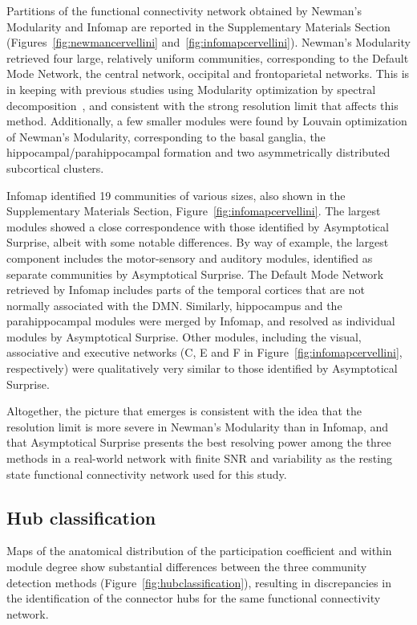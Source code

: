 Partitions of the functional connectivity network obtained by Newman's Modularity and Infomap are reported in the Supplementary Materials Section (Figures~\ref{fig:newmancervellini} and~\ref{fig:infomapcervellini}).
Newman's Modularity retrieved four large, relatively uniform communities, corresponding to the Default Mode Network, the central network, occipital and frontoparietal networks.
This is in keeping with previous studies using Modularity optimization by spectral decomposition~\cite{crossley2013a}, and consistent with the strong resolution limit that affects this method.
Additionally, a few smaller modules were found by Louvain optimization of Newman's Modularity, corresponding to the basal ganglia, the hippocampal/parahippocampal formation and two asymmetrically distributed subcortical clusters.

Infomap identified 19 communities of various sizes, also shown in the Supplementary Materials Section, Figure~\ref{fig:infomapcervellini}.
The largest modules showed a close correspondence with those identified by Asymptotical Surprise, albeit with some notable differences.
By way of example, the largest component includes the motor-sensory and auditory modules, identified as separate communities by Asymptotical Surprise.
The Default Mode Network retrieved by Infomap includes parts of the temporal cortices that are not normally associated with the DMN.
Similarly, hippocampus and the parahippocampal modules were merged by Infomap, and resolved as individual modules by Asymptotical Surprise.
Other modules, including the visual, associative and executive networks (C, E and F in Figure~\ref{fig:infomapcervellini}, respectively) were qualitatively very similar to those identified by Asymptotical Surprise.

Altogether, the picture that emerges is consistent with the idea that the resolution limit is more severe in Newman's Modularity than in Infomap, and that Asymptotical Surprise presents the best resolving power among the three methods in a real-world network with finite SNR and variability as the resting state functional connectivity network used for this study.

\subsection{Hub classification}
Maps of the anatomical distribution of the participation coefficient and within module degree show substantial differences between the three community detection methods (Figure~\ref{fig:hubclassification}), resulting in discrepancies in the identification of the connector hubs for the same functional connectivity network.

